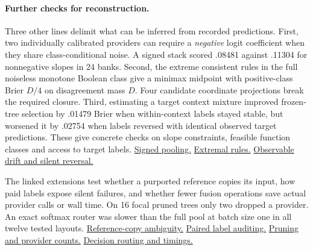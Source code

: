 \paragraph{Further checks for reconstruction.}
Three other lines delimit what can be inferred from recorded predictions.
First, two individually calibrated providers can require a \emph{negative}
logit coefficient when they share class-conditional noise. A signed stack
scored .08481 against .11304 for nonnegative slopes in 24 banks.
Second, the extreme consistent rules in the full noiseless monotone Boolean
class give a minimax midpoint with positive-class Brier $D/4$ on disagreement
mass $D$. Four candidate coordinate projections break the required closure.
Third, estimating a target context mixture improved frozen-tree selection by
.01479 Brier when within-context labels stayed stable, but worsened it by
.02754 when labels reversed with identical observed target predictions.
These give concrete checks on slope constraints, feasible function classes
and access to target labels.
\href{https://github.com/damiankucharski/fusionbench/blob/62afd10/docs/ensemble-study/calibrated-suppressor/README.md}{Signed pooling.}
\href{https://github.com/damiankucharski/fusionbench/blob/d4b9c98/docs/ensemble-study/monotone-envelope/README.md}{Extremal rules.}
\href{https://github.com/damiankucharski/fusionbench/blob/e529e8c/docs/ensemble-study/frozen-pair-ranking/README.md}{Observable drift and silent reversal.}

The linked extensions test whether a purported reference copies its input,
how paid labels expose silent failures, and whether fewer fusion operations
save actual provider calls or wall time. On 16 focal pruned trees only two
dropped a provider. An exact softmax router was slower than the full pool at
batch size one in all twelve tested layouts.
\href{https://github.com/damiankucharski/fusionbench/blob/27edd41/docs/ensemble-study/reference-copy/README.md}{Reference-copy ambiguity.}
\href{https://github.com/damiankucharski/OKAPI/blob/3f64a16/experiments/paired_label_audit/README.md}{Paired label auditing.}
\href{https://github.com/damiankucharski/fusionbench/blob/9af5f79/docs/ensemble-study/prune-frozen-mix/README.md}{Pruning and provider counts.}
\href{https://github.com/damiankucharski/fusionbench/blob/2204351/docs/ensemble-study/softmax-routing/README.md}{Decision routing and timings.}
